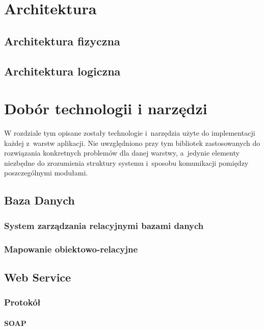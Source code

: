 \documentclass[11pt]{aghdpl}
\begin{document}
\chapter{Architektura}
\label{cha:architektura}
\section{Architektura fizyczna}
\label{sec:architektura_fizyczna}
\section{Architektura logiczna}
\label{sec:architektura_logiczna}

\chapter{Dobór technologii i narzędzi}
\label{cha:dobor_technologii_i_narzedzi}

W rozdziale tym opisane zostały technologie i~narzędzia użyte do implementacji każdej z~warstw aplikacji. Nie uwzględniono przy tym bibliotek zastosowanych do rozwiązania konkretnych problemów dla danej warstwy, a~jedynie elementy niezbędne do zrozumienia struktury systemu i~sposobu komunikacji pomiędzy poszczególnymi modułami.


\section{Baza Danych}
\subsection{System zarządzania relacyjnymi bazami danych}
\subsection{Mapowanie obiektowo-relacyjne}
\section{Web Service}
\subsection{Protokół}
\subsubsection{SOAP}
\end{document}
